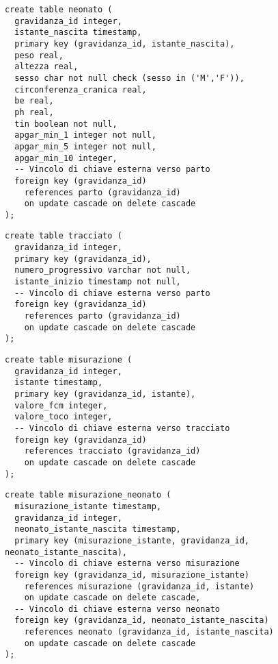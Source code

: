\begin{lstlisting}[float,caption={Definizione della tabella \tab{neonato}.},label=ptabneonato]
create table neonato (
  gravidanza_id integer,
  istante_nascita timestamp,
  primary key (gravidanza_id, istante_nascita),
  peso real,
  altezza real,
  sesso char not null check (sesso in ('M','F')),
  circonferenza_cranica real,
  be real,
  ph real,
  tin boolean not null,
  apgar_min_1 integer not null,
  apgar_min_5 integer not null,
  apgar_min_10 integer,
  -- Vincolo di chiave esterna verso parto
  foreign key (gravidanza_id)
    references parto (gravidanza_id)
    on update cascade on delete cascade
);
\end{lstlisting}

\begin{lstlisting}[float,caption={Definizione della tabella \tab{tracciato}.},label=ptabtracciato]
create table tracciato (
  gravidanza_id integer,
  primary key (gravidanza_id),
  numero_progressivo varchar not null,
  istante_inizio timestamp not null,
  -- Vincolo di chiave esterna verso parto
  foreign key (gravidanza_id)
    references parto (gravidanza_id)
    on update cascade on delete cascade
);
\end{lstlisting}

\begin{lstlisting}[float,caption={Definizione della tabella \tab{misurazione}.},label=ptabmisurazione]
create table misurazione (
  gravidanza_id integer,
  istante timestamp,
  primary key (gravidanza_id, istante),
  valore_fcm integer,
  valore_toco integer,
  -- Vincolo di chiave esterna verso tracciato
  foreign key (gravidanza_id)
    references tracciato (gravidanza_id)
    on update cascade on delete cascade
);
\end{lstlisting}

\begin{lstlisting}[float,caption={Definizione della tabella \tab{misurazione\_neonato}.},label=ptabmisurazioneneonato]
create table misurazione_neonato (
  misurazione_istante timestamp,
  gravidanza_id integer,
  neonato_istante_nascita timestamp,
  primary key (misurazione_istante, gravidanza_id, neonato_istante_nascita),
  -- Vincolo di chiave esterna verso misurazione
  foreign key (gravidanza_id, misurazione_istante)
    references misurazione (gravidanza_id, istante)
    on update cascade on delete cascade,
  -- Vincolo di chiave esterna verso neonato
  foreign key (gravidanza_id, neonato_istante_nascita)
    references neonato (gravidanza_id, istante_nascita)
    on update cascade on delete cascade
);
\end{lstlisting}

